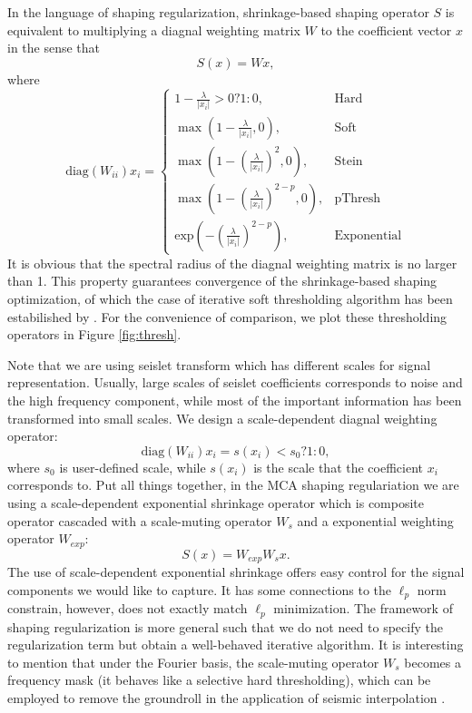  In the language of shaping regularization, shrinkage-based shaping operator $S$ is equivalent to multiplying a diagnal weighting matrix $W$ to the coefficient vector $x$ in the sense that
\begin{equation}
 S(x)=Wx,
\end{equation}
where 
\begin{equation}
 \mathrm{diag}(W_{ii})x_i=
 \begin{cases}
 1-\frac{\lambda}{|x_i|}>0?1:0, & \mathrm{Hard}\\
 \max(1-\frac{\lambda}{|x_i|},0), & \mathrm{Soft}\\
 \max(1-\left(\frac{\lambda}{|x_i|}\right)^2,0), & \mathrm{Stein}\\
 \max(1-\left(\frac{\lambda}{|x_i|}\right)^{2-p},0), & \mathrm{pThresh}\\
 \mathrm{exp}(-(\frac{\lambda}{|x_i|})^{2-p}),& \mathrm{Exponential}
 \end{cases}
\end{equation}
It is obvious that the spectral radius of the diagnal weighting matrix is no larger than 1. This property guarantees convergence of the shrinkage-based shaping optimization, of which the case of iterative soft thresholding algorithm has been estabilished by  \cite{daubechies2004iterative}. For the convenience of comparison, we plot these thresholding operators in Figure \ref{fig:thresh}. 


Note that we are using seislet transform which has different scales for signal representation. Usually, large scales of seislet coefficients corresponds to noise and the high frequency component, while most of the important information has been transformed into small scales. We design a scale-dependent diagnal weighting operator:
\begin{equation}
 \mathrm{diag}(W_{ii})x_i= s(x_i)<s_0?1:0,
\end{equation}
where $s_0$ is user-defined scale, while $s(x_i)$ is the scale that the coefficient $x_i$ corresponds to.  Put all things together, in the MCA shaping regulariation we are using a scale-dependent exponential shrinkage operator which is composite operator cascaded with a scale-muting operator $W_{s}$ and a exponential weighting operator $W_{exp}$:
\begin{equation}
 S(x)=W_{exp} W_s x.
\end{equation}
The use of scale-dependent exponential shrinkage offers easy control for the signal components we would like to capture. It has some connections to the $\ell_p$ norm constrain, however, does not exactly match $\ell_p$ minimization. The framework of shaping regularization is more general such that we do not need to specify the regularization term but obtain a well-behaved iterative algorithm. It is interesting to mention that under the Fourier basis, the scale-muting operator $W_s$ becomes a frequency mask (it behaves like a selective hard thresholding), which can be employed to remove the groundroll in the application of seismic interpolation \citep{gholami2014non}.


